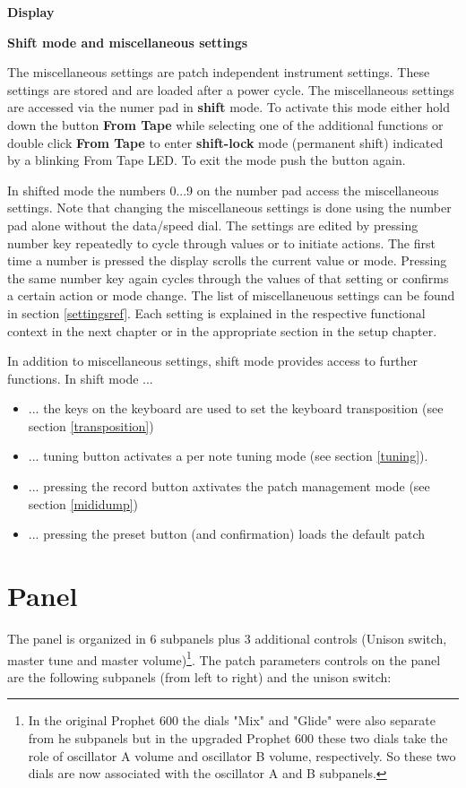 \documentclass[landscape, 11pt, oneside]{report}
\newenvironment{flowtext}{\addmargin[0cm]{7cm}}{\endaddmargin} %
\begin{document}
\begin{flowtext}
\textbf{Display}



\textbf{Shift mode and miscellaneous settings}

The miscellaneous settings are patch independent instrument settings. These settings are stored and are loaded after a power cycle. The miscellaneous settings are accessed via the numer pad in \textbf{shift} mode. To activate this mode either hold down the button \textbf{From Tape} while selecting one of the additional functions or double click \textbf{From Tape} to enter \textbf{shift-lock} mode (permanent shift) indicated by a blinking From Tape LED. To exit the mode push the button again. 

In shifted mode the numbers 0...9 on the number pad access the miscellaneous settings. Note that changing the miscellaneous settings is done using the number pad alone without the data/speed dial. The settings are edited by pressing number key repeatedly to cycle through values or to initiate actions. The first time a number is pressed the display scrolls the current value or mode. Pressing the same number key again cycles through the values of that setting or confirms a certain action or mode change. The list of miscellaneuous settings can be found in section \ref{settingsref}. Each setting is explained in the respective functional context in the next chapter or in the appropriate section in the setup chapter.

In addition to miscellaneous settings, shift mode provides access to further functions. In shift mode ...
\begin{itemize}
  \item ... the keys on the keyboard are used to set the keyboard transposition (see section \ref{transposition}) 
  \item ... tuning button activates a per note tuning mode (see section \ref{tuning}).
  \item ... pressing the record button axtivates the patch management mode (see section \ref{mididump})
  \item ... pressing the preset button (and confirmation) loads the default patch
\end{itemize}

\section{Panel}\label{panel}

The panel is organized in 6 subpanels plus 3 additional controls (Unison switch, master tune and master volume)\footnote{In the original Prophet 600 the dials "Mix" and "Glide" were also separate from he subpanels but in the upgraded Prophet 600 these two dials take the role of oscillator A volume and oscillator B volume, respectively. So these two dials are now associated with the oscillator A and B subpanels.}. The patch parameters controls on the panel are the following subpanels (from left to right) and the unison switch: 


\end{flowtext}
\end{document}
